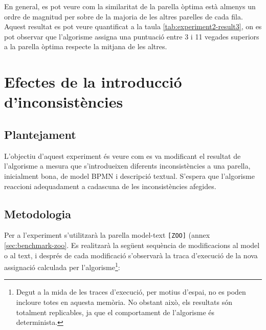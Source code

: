 En general, es pot veure com la similaritat de la parella òptima està almenys un ordre de magnitud per sobre de la majoria de les altres parelles de cada fila. Aquest resultat es pot veure quantificat a la taula \ref{tab:experiment2-result3}, on es pot observar que l'algorisme assigna una puntuació entre 3 i 11 vegades superiors a la parella òptima respecte la mitjana de les altres.



\section{Efectes de la introducció d'inconsistències}
\label{sec:experiments-inconsistencies}

\subsection{Plantejament}

L'objectiu d'aquest experiment és veure com es va modificant el resultat de l'algorisme a mesura que s'introdueixen diferents inconsistències a una parella, inicialment bona, de model BPMN i descripció textual. S'espera que l'algorisme reaccioni adequadament a cadascuna de les inconsistències afegides. 

\subsection{Metodologia}

Per a l'experiment s'utilitzarà la parella model-text \texttt{[ZOO]} (annex \ref{sec:benchmark-zoo}. Es realitzarà la següent sequència de modificacions al model o al text, i després de cada modificació s'observarà la traca d'execució de la nova assignació calculada per l'algorisme\footnote{Degut a la mida de les traces d'execució, per motius d'espai, no es poden incloure totes en aquesta memòria. No obstant això, els resultats són totalment replicables, ja que el comportament de l'algorisme és determinista.}:

